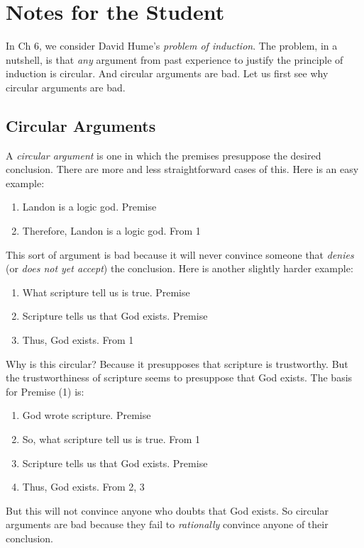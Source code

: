 \documentclass[oneside,letterpaper,12pt]{book}
\begin{document}
\protect\hypertarget{link2HCH0007}{}{}

\pagebreak
\section{Notes for the Student}
In Ch 6, we consider David Hume's \textit{problem of induction}. The problem, in a nutshell, is that \textit{any} argument from past experience to justify the principle of induction is circular. And circular arguments are bad. Let us first see why circular arguments are bad.
\subsection*{Circular Arguments}
A \textit{circular argument} is one in which the premises presuppose the desired conclusion. There are more and less straightforward cases of this. Here is an easy example:
\begin{enumerate}
	\item Landon is a logic god. \hfill Premise
	\item Therefore, Landon is a logic god. \hfill From 1
\end{enumerate}
This sort of argument is bad because it will never convince someone that \textit{denies} (or \textit{does not yet accept}) the conclusion. Here is another slightly harder example:
\begin{enumerate}
	\item What scripture tell us is true. \hfill Premise
	\item Scripture tells us that God exists. \hfill Premise
	\item Thus, God exists. \hfill From 1
\end{enumerate}
Why is this circular? Because it presupposes that scripture is trustworthy. But the trustworthiness of scripture seems to presuppose that God exists. The basis for Premise (1) is:
\begin{enumerate}
	\item God wrote scripture. \hfill Premise
	\item So, what scripture tell us is true. \hfill From 1
	\item Scripture tells us that God exists. \hfill Premise
	\item Thus, God exists. \hfill From 2, 3
\end{enumerate}
But this will not convince anyone who doubts that God exists. So circular arguments are bad because they fail to \textit{rationally} convince anyone of their conclusion.
\end{document}
